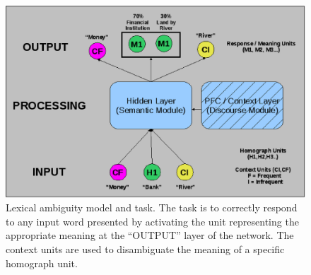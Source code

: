 \begin{figure}[tp]
\begin{center}
	\includegraphics[width=115mm]{figures/lexAmb_network_cartoon.eps}
\end{center}
\caption{Lexical ambiguity model and task.  The task is to correctly respond to any input word presented by activating the unit representing the appropriate meaning at the ``OUTPUT'' layer of the network.  The context units are used to disambiguate the meaning of a specific homograph unit.}

\label{lexamb-model-task}
\end{figure} 

